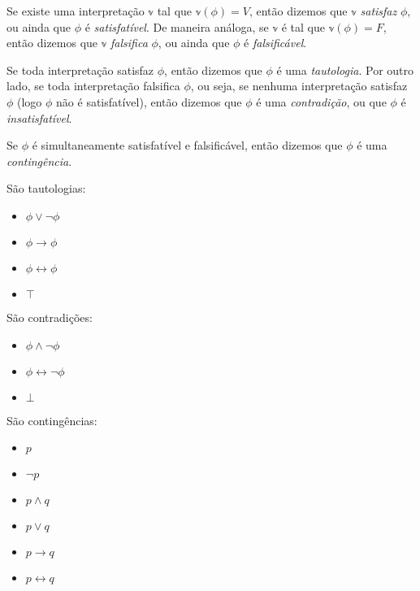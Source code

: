 \begin{definition}
	Se existe uma interpretação $\mathbb{v}$ tal que $\mathbb{v}(\phi) = V$, então dizemos que $\mathbb{v}$ \emph{satisfaz} $\phi$, ou ainda que $\phi$ é \emph{satisfatível}. De maneira análoga, se $\mathbb{v}$ é tal que $\mathbb{v}(\phi) = F$, então dizemos que $\mathbb{v}$ \emph{falsifica} $\phi$, ou ainda que $\phi$ é \emph{falsificável}.
	
	Se toda interpretação satisfaz $\phi$, então dizemos que $\phi$ é uma \emph{tautologia}. Por outro lado, se toda interpretação falsifica $\phi$, ou seja, se nenhuma interpretação satisfaz $\phi$ (logo $\phi$ não é satisfatível), então dizemos que $\phi$ é uma \emph{contradição}, ou que $\phi$ é \emph{insatisfatível}.
	
	Se $\phi$ é simultaneamente satisfatível e falsificável, então dizemos que $\phi$ é uma \emph{contingência}.
\end{definition}

\begin{example}
    São tautologias:
    \begin{itemize}
        \item $\phi \vee \neg \phi$
        \item $\phi \rightarrow \phi$
        \item $\phi \leftrightarrow \phi$
        \item $\top$
    \end{itemize}
    São contradições:
    \begin{itemize}
        \item $\phi \wedge \neg \phi$
        \item $\phi \leftrightarrow \neg \phi$
        \item $\bot$
    \end{itemize}
    São contingências:
    \begin{itemize}
    	\item $p$
    	\item $\neg p$
    	\item $p \wedge q$
    	\item $p \vee q$
    	\item $p \rightarrow q$
    	\item $p \leftrightarrow q$
    \end{itemize}
\end{example}

